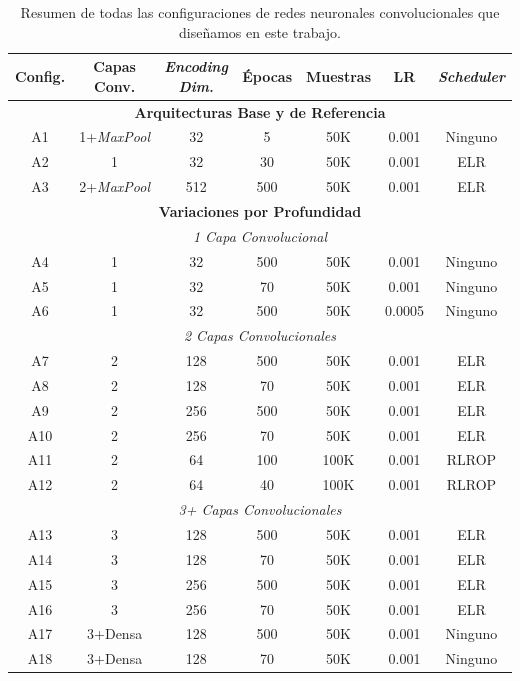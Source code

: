 \begin{table}[htbp]
\centering
\caption{Resumen de todas las configuraciones de redes neuronales convolucionales que diseñamos en este trabajo.}
\label{tab:autoencoder_configs}
\scriptsize
\begin{tabular}{|c|c|c|c|c|c|c|}
\hline
\textbf{Config.} & \textbf{Capas Conv.} & \textbf{\emph{Encoding Dim.}} & \textbf{Épocas} & \textbf{Muestras} & \textbf{LR} & \textbf{\emph{Scheduler}} \\
\hline
\hline
\multicolumn{7}{|c|}{\textbf{Arquitecturas Base y de Referencia}} \\
\hline
A1 & 1+\emph{MaxPool} & 32 & 5 & 50K & 0.001 & Ninguno \\
A2 & 1 & 32 & 30 & 50K & 0.001 & ELR \\
A3 & 2+\emph{MaxPool} & 512 & 500 & 50K & 0.001 & ELR \\
\hline
\hline
\multicolumn{7}{|c|}{\textbf{Variaciones por Profundidad}} \\
\hline
\multicolumn{7}{|c|}{\textit{1 Capa Convolucional}} \\
\hline
A4 & 1 & 32 & 500 & 50K & 0.001 & Ninguno \\
A5 & 1 & 32 & 70 & 50K & 0.001 & Ninguno \\
A6 & 1 & 32 & 500 & 50K & 0.0005 & Ninguno \\
\hline
\multicolumn{7}{|c|}{\textit{2 Capas Convolucionales}} \\
\hline
A7 & 2 & 128 & 500 & 50K & 0.001 & ELR \\
A8 & 2 & 128 & 70 & 50K & 0.001 & ELR \\
A9 & 2 & 256 & 500 & 50K & 0.001 & ELR \\
A10 & 2 & 256 & 70 & 50K & 0.001 & ELR \\
A11 & 2 & 64 & 100 & 100K & 0.001 & RLROP \\
A12 & 2 & 64 & 40 & 100K & 0.001 & RLROP \\
\hline
\multicolumn{7}{|c|}{\textit{3+ Capas Convolucionales}} \\
\hline
A13 & 3 & 128 & 500 & 50K & 0.001 & ELR \\
A14 & 3 & 128 & 70 & 50K & 0.001 & ELR \\
A15 & 3 & 256 & 500 & 50K & 0.001 & ELR \\
A16 & 3 & 256 & 70 & 50K & 0.001 & ELR \\
A17 & 3+Densa & 128 & 500 & 50K & 0.001 & Ninguno \\
A18 & 3+Densa & 128 & 70 & 50K & 0.001 & Ninguno \\

\end{tabular}
\end{table}
